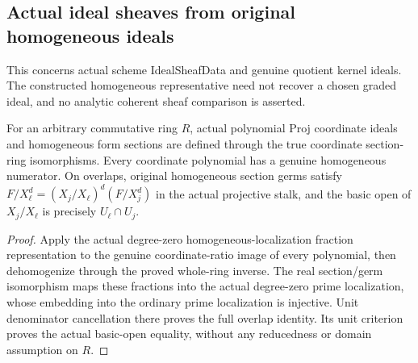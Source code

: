 \subsection{Actual ideal sheaves from original homogeneous ideals}
\label{subsec:projective-ideal-representation}

This concerns actual scheme IdealSheafData and genuine quotient kernel ideals.
The constructed homogeneous representative need not recover a chosen
graded ideal, and no analytic coherent sheaf comparison is asserted.

\begin{theorem}
\label{projective:actual-homogeneous-form-overlap-sections}
\leanok
{}
For an arbitrary commutative ring $R$, actual polynomial Proj coordinate
ideals and homogeneous form sections are defined through the true coordinate
section-ring isomorphisms. Every coordinate polynomial has a genuine
homogeneous numerator. On overlaps, original homogeneous section germs satisfy
$F/X_\ell^d=(X_j/X_\ell)^d(F/X_j^d)$ in the actual projective stalk, and
the basic open of $X_j/X_\ell$ is precisely $U_\ell\cap U_j$.
\end{theorem}
\begin{proof}
Apply the actual degree-zero homogeneous-localization fraction representation
to the genuine coordinate-ratio image of every polynomial, then dehomogenize
through the proved whole-ring inverse. The real section/germ isomorphism maps
these fractions into the actual degree-zero prime localization, whose embedding
into the ordinary prime localization is injective. Unit denominator cancellation
there proves the full overlap identity. Its unit criterion proves the actual
basic-open equality, without any reducedness or domain assumption on $R$.
\end{proof}

